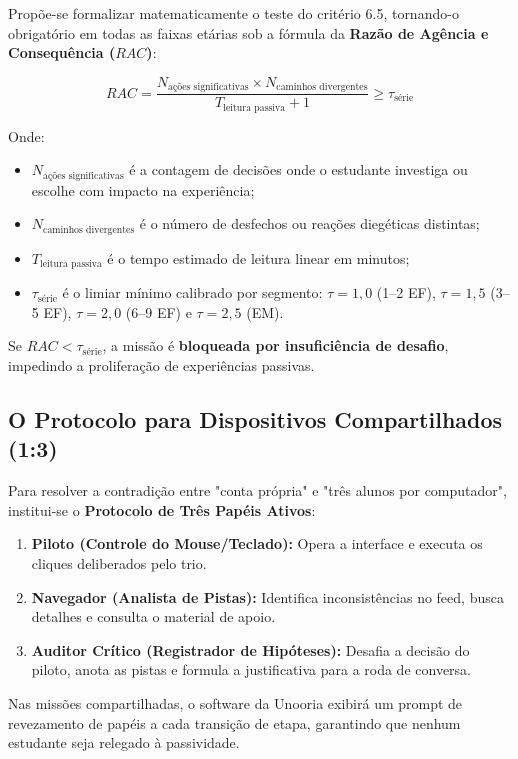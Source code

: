 \documentclass[11pt,a4paper]{article}
\begin{document}
Prop\~oe-se formalizar matematicamente o teste do crit\'erio 6.5, tornando-o obrigat\'orio em todas as faixas et\'arias sob a f\'ormula da \textbf{Raz\~ao de Ag\^encia e Consequ\^encia ($RAC$)}:

\begin{equation}
RAC = \frac{N_{\text{a\c{c}\~oes significativas}} \times N_{\text{caminhos divergentes}}}{T_{\text{leitura passiva}} + 1} \ge \tau_{\text{s\'erie}}
\end{equation}

Onde:
\begin{itemize}
    \item $N_{\text{a\c{c}\~oes significativas}}$ \'e a contagem de decis\~oes onde o estudante investiga ou escolhe com impacto na experi\^encia;
    \item $N_{\text{caminhos divergentes}}$ \'e o n\'umero de desfechos ou rea\c{c}\~oes dieg\'eticas distintas;
    \item $T_{\text{leitura passiva}}$ \'e o tempo estimado de leitura linear em minutos;
    \item $\tau_{\text{s\'erie}}$ \'e o limiar m\'inimo calibrado por segmento: $\tau = 1{,}0$ (1\textordmasculine{}--2\textordmasculine{} EF), $\tau = 1{,}5$ (3\textordmasculine{}--5\textordmasculine{} EF), $\tau = 2{,}0$ (6\textordmasculine{}--9\textordmasculine{} EF) e $\tau = 2{,}5$ (EM).
\end{itemize}

Se $RAC < \tau_{\text{s\'erie}}$, a miss\~ao \'e \textbf{bloqueada por insufici\^encia de desafio}, impedindo a prolifera\c{c}\~ao de experi\^encias passivas.

\subsection{O Protocolo para Dispositivos Compartilhados (1:3)}

Para resolver a contradi\c{c}\~ao entre "conta pr\'opria" e "tr\^es alunos por computador", institui-se o \textbf{Protocolo de Tr\^es Pap\'eis Ativos}:
\begin{enumerate}
    \item \textbf{Piloto (Controle do Mouse/Teclado):} Opera a interface e executa os cliques deliberados pelo trio.
    \item \textbf{Navegador (Analista de Pistas):} Identifica inconsist\^encias no feed, busca detalhes e consulta o material de apoio.
    \item \textbf{Auditor Cr\'itico (Registrador de Hip\'oteses):} Desafia a decis\~ao do piloto, anota as pistas e formula a justificativa para a roda de conversa.
\end{enumerate}
Nas miss\~oes compartilhadas, o software da Unooria exibir\'a um prompt de revezamento de pap\'eis a cada transi\c{c}\~ao de etapa, garantindo que nenhum estudante seja relegado \`a passividade.
\end{document}
